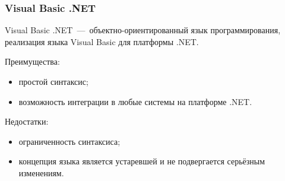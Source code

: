 \subsubsection{Visual Basic .NET}
Visual Basic .NET~---~объектно-ориентированный язык программирования, реализация языка Visual Basic для платформы .NET.

Преимущества:
\begin{itemize}
	\item простой синтаксис;
	\item возможность интеграции в любые системы на платформе .NET.
\end{itemize}

Недостатки:
\begin{itemize}
	\item ограниченность синтаксиса;
	\item концепция языка является устаревшей и не подвергается серьёзным изменениям.~\cite{WikiVBNet}
\end{itemize}